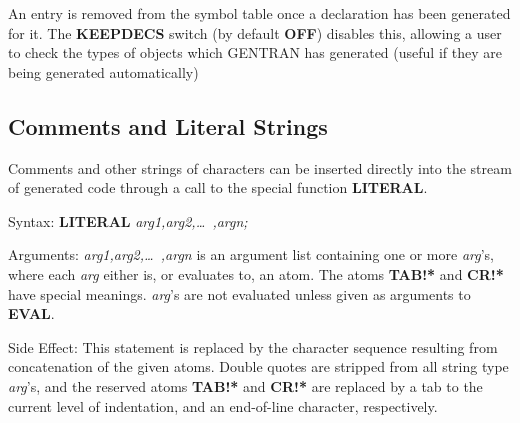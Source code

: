 An entry is removed from the symbol table once a declaration has been
generated for it.  The {\bf KEEPDECS} switch (by default {\bf OFF})
disables this, allowing a user to check the types of objects
 which GENTRAN has generated (useful if they
are being generated automatically)

\subsection{Comments and Literal Strings}
\label{comments} 
Comments and other strings of characters can be inserted directly into
the stream of generated code through a call to the special function
{\bf LITERAL}.
\begin{describe}{Syntax:}
{\bf LITERAL} {\it  arg1,arg2,\dots\  ,argn;}
\end{describe}
\begin{describe}{Arguments:}
{\it arg1,arg2,\dots\  ,argn} is an argument list containing one or more
{\it arg}'s, where each {\it arg} either is, or evaluates to, an atom.  The
  
atoms {\bf TAB!*} and {\bf CR!*} have special meanings.  {\it arg}'s are
not evaluated unless given as arguments to {\bf EVAL}.
\end{describe}
\begin{describe}{Side Effect:}
This statement is replaced by the character sequence resulting from
concatenation of the given atoms.  Double quotes are stripped from
all string type {\it arg}'s, and the reserved atoms {\bf TAB!*} and
{\bf CR!*} are replaced by a tab to the current level of indentation, and
an end-of-line character, respectively.
\end{describe}
